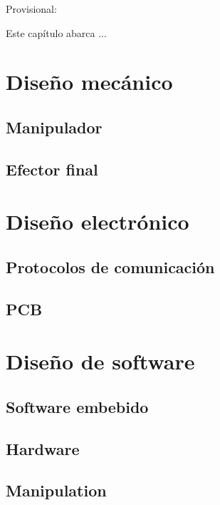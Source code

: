 Provisional:

Este capítulo abarca ...

\section{Diseño mecánico}

\subsection{Manipulador}

\subsection{Efector final}

\section{Diseño electrónico}

\subsection{Protocolos de comunicación}

\subsection{PCB}

\section{Diseño de software}

\subsection{Software embebido}

\subsection{Hardware}

\subsection{Manipulation}
